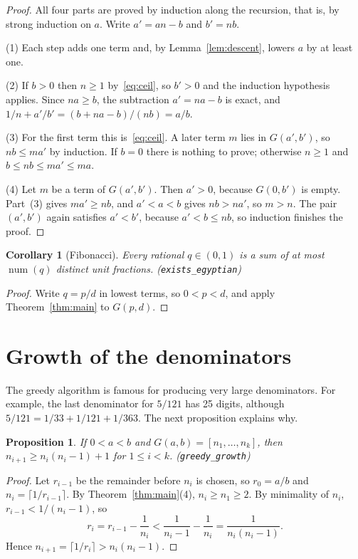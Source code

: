 \documentclass[11pt]{article}
\newtheorem{proposition}[theorem]{Proposition}
\newtheorem{corollary}[theorem]{Corollary}
\theoremstyle{definition}
\theoremstyle{remark}
\begin{document}
\begin{proof}
All four parts are proved by induction along the recursion, that is, by strong induction on $a$.
Write $a' = an - b$ and $b' = nb$.

(1) Each step adds one term and, by Lemma~\ref{lem:descent}, lowers $a$ by at least one.

(2) If $b > 0$ then $n \ge 1$ by~\eqref{eq:ceil}, so $b' > 0$ and the induction hypothesis
applies. Since $na \ge b$, the subtraction $a' = na - b$ is exact, and
$1/n + a'/b' = (b + na - b)/(nb) = a/b$.

(3) For the first term this is~\eqref{eq:ceil}. A later term $m$ lies in $G(a',b')$, so
$nb \le m a'$ by induction. If $b = 0$ there is nothing to prove; otherwise $n \ge 1$ and
$b \le nb \le m a' \le m a$.

(4) Let $m$ be a term of $G(a',b')$. Then $a' > 0$, because $G(0,b')$ is empty. Part~(3) gives
$m a' \ge nb$, and $a' < a < b$ gives $nb > na'$, so $m > n$. The pair $(a',b')$ again satisfies
$a' < b'$, because $a' < b \le nb$, so induction finishes the proof.
\end{proof}

\begin{corollary}[Fibonacci]\label{cor:fib}
Every rational $q \in (0,1)$ is a sum of at most $\operatorname{num}(q)$ distinct unit fractions.
\hfill (\texttt{exists\_egyptian})
\end{corollary}

\begin{proof}
Write $q = p/d$ in lowest terms, so $0 < p < d$, and apply Theorem~\ref{thm:main} to $G(p,d)$.
\end{proof}

\section{Growth of the denominators}

The greedy algorithm is famous for producing very large denominators. For example, the last
denominator for $5/121$ has 25 digits, although
$5/121 = 1/33 + 1/121 + 1/363$. The next proposition explains why.

\begin{proposition}\label{prop:growth}
If $0 < a < b$ and $G(a,b) = [n_1,\dots,n_k]$, then $n_{i+1} \ge n_i(n_i-1)+1$ for $1 \le i < k$.
\hfill (\texttt{greedy\_growth})
\end{proposition}

\begin{proof}
Let $r_{i-1}$ be the remainder before $n_i$ is chosen, so $r_0 = a/b$ and
$n_i = \lceil 1/r_{i-1} \rceil$. By Theorem~\ref{thm:main}(4), $n_i \ge n_1 \ge 2$. By minimality
of $n_i$, $r_{i-1} < 1/(n_i - 1)$, so
\[
  r_i = r_{i-1} - \frac{1}{n_i} < \frac{1}{n_i-1} - \frac{1}{n_i} = \frac{1}{n_i(n_i-1)} .
\]
Hence $n_{i+1} = \lceil 1/r_i \rceil > n_i(n_i-1)$.
\end{proof}
\end{document}
